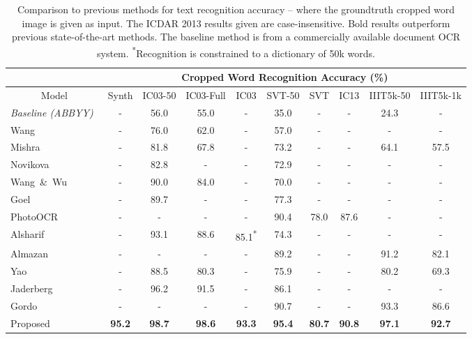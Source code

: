 \documentclass[twocolumn]{svjour3}          \smartqed  \usepackage{epsfig}
\begin{document}
\setlength{\tabcolsep}{3pt}
\begin{table*}[t]
\begin{center}
\begin{tabular}[t]{|l||c|c|c|c|c|c|c|c|c|}
\cline{2-10} 
\multicolumn{1}{c|}{\centering ~} & 
\multicolumn{9}{|c|}{\bf Cropped Word Recognition Accuracy (\%)}\\
\hline
\multicolumn{1}{|c||}{\centering Model} & 
\multicolumn{1}{c|}{\centering Synth} &
\multicolumn{1}{c|}{\centering IC03-50} &
\multicolumn{1}{c|}{\centering IC03-Full} &
\multicolumn{1}{c|}{\centering IC03} &
\multicolumn{1}{c|}{\centering SVT-50} &
\multicolumn{1}{c|}{\centering SVT} &
\multicolumn{1}{c|}{\centering IC13}&
\multicolumn{1}{c|}{\centering IIIT5k-50}&
\multicolumn{1}{c|}{\centering IIIT5k-1k}\\
\hline\hline
\emph{Baseline (ABBYY)}~\cite{Wang11,Yao14} & - & 56.0 & 55.0 & - & 35.0 & - & - & 24.3 & -\\
\rowcolor{Gray}
Wang~\cite{Wang11}          & - & 76.0 & 62.0 & - & 57.0 & - & - & - & -\\
Mishra~\cite{Mishra12}      & - & 81.8 & 67.8 & - & 73.2 & - & - & 64.1 & 57.5\\
\rowcolor{Gray}
Novikova~\cite{Novikova12}  & - & 82.8 & - & - & 72.9 & - & - & - & -\\
Wang~\&~Wu~\cite{Wang12}    & - & 90.0 & 84.0 & - & 70.0 & - & - & - & -\\
\rowcolor{Gray}
Goel~\cite{Goel13}          & - & 89.7 & - & - & 77.3 & - & - & - & -\\
PhotoOCR~\cite{Bissacco13} & - & - & - & - & 90.4 & 78.0 & 87.6 & - & -\\
\rowcolor{Gray}
Alsharif~\cite{Alsharif13}  & - & 93.1 & 88.6 & 85.1\textsuperscript{*} & 74.3 & - & - & - & -\\
Almazan~\cite{Almazan14} & - & - & - & - & 89.2 & - & - & 91.2 & 82.1\\
\rowcolor{Gray}
Yao~\cite{Yao14}  & - & 88.5 & 80.3 & - & 75.9 & - & - & 80.2 & 69.3\\
Jaderberg~\cite{Jaderberg14a}  & - & 96.2 & 91.5 & - & 86.1 & - & - & - & -\\
\rowcolor{Gray}
Gordo~\cite{Gordo14} & - & - & - & - & 90.7 & - & - & 93.3 & 86.6\\
\hline
Proposed     & \bf 95.2 & \bf 98.7 & \bf 98.6 & \bf{93.3} & \bf 95.4 & \bf 80.7 & \bf 90.8 & \bf 97.1 & \bf 92.7\\
\hline
\end{tabular}
\end{center}
\vspace*{-1em}
\caption{\small Comparison to previous methods for text recognition accuracy -- where the groundtruth cropped word image is given as input. The ICDAR 2013 results given are case-insensitive. Bold results outperform previous state-of-the-art methods. The baseline method is from a commercially available document OCR system. \textsuperscript{*}Recognition is constrained to a dictionary of 50k words.}
\label{table:recognition}
\end{table*}
\end{document}

